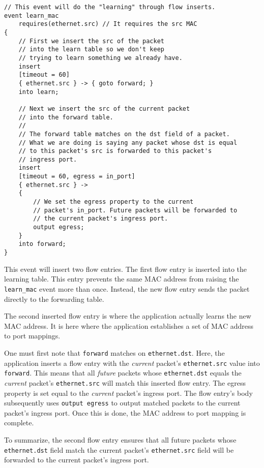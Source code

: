 \begin{codepage}
\begin{lstlisting}
// This event will do the "learning" through flow inserts.
event learn_mac
	requires(ethernet.src) // It requires the src MAC
{
	// First we insert the src of the packet
	// into the learn table so we don't keep
	// trying to learn something we already have.
	insert
	[timeout = 60]
	{ ethernet.src } -> { goto forward; }
	into learn;

	// Next we insert the src of the current packet
	// into the forward table.
	//
	// The forward table matches on the dst field of a packet.
	// What we are doing is saying any packet whose dst is equal
	// to this packet's src is forwarded to this packet's
	// ingress port.
	insert
	[timeout = 60, egress = in_port]
	{ ethernet.src } ->
	{
		// We set the egress property to the current
		// packet's in_port. Future packets will be forwarded to
		// the current packet's ingress port.
		output egress;
	}
	into forward;
}
\end{lstlisting}
\end{codepage}



This event will insert two flow entries. The first flow entry is inserted into
the learning table. This entry prevents the same MAC address from raising the
\texttt{learn\_mac} event more than once. Instead, the new flow entry sends the
packet directly to the forwarding table.

The second inserted flow entry is where the application actually learns the new MAC
address. It is here where the application establishes a set of MAC address to port mappings.

One must first note that \texttt{forward} matches on \texttt{ethernet.dst}. Here, the application inserts a
flow entry with the \textit{current} packet's \texttt{ethernet.src} value into
\texttt{forward}. This means that all \textit{future} packets whose
\texttt{ethernet.dst} equals the \textit{current} packet's \texttt{ethernet.src}
will match this inserted flow entry. The egress property is set equal to the
\textit{current} packet's ingress port. The flow entry's body subsequently uses
\texttt{output egress} to output matched packets to the current packet's ingress port. Once this is done, the MAC address to port mapping is complete.

To summarize, the second flow entry ensures that all future packets whose
\texttt{ethernet.dst} field match the current packet's \texttt{ethernet.src}
field will be forwarded to the current packet's ingress port.

